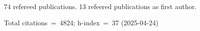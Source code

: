 74 refereed publications. 13 refeered publications as first author.

Total citations~=~4824; h-index~=~37 (2025-04-24)